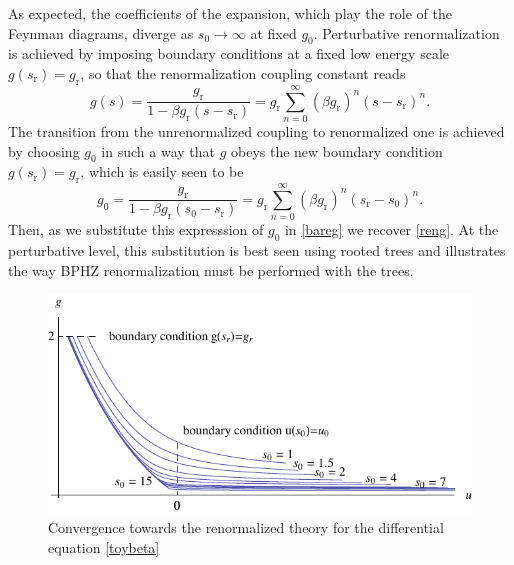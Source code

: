 \documentclass[10pt,here,feynmf]{article}
\begin{document}
As expected, the coefficients of the expansion, which play the role of the Feynman diagrams,  diverge as $s_{0}\rightarrow\infty$ at fixed $g_{0}$. Perturbative renormalization is achieved by imposing boundary conditions at a fixed low energy scale $g(s_{\mathrm{r}})=g_{\mathrm{r}}$, so that the renormalization coupling constant reads
 \begin{equation}
g(s)=\frac{g_{\mathrm{r}}}{1-\beta g_{\mathrm{r}}(s-s_{\mathrm{r}})}=g_{\mathrm{r}}\sum_{n=0}^{\infty}(\beta g_{\mathrm{r}})^{n}(s-s_{\mathrm{r}})^{n}.
\label{reng}
\end{equation}
The transition from the unrenormalized coupling to renormalized one is achieved by choosing $g_{0}$ in such a way that $g$ obeys the new boundary condition $g(s_{\mathrm{r}})=g_{\mathrm{r}}$, which is easily seen to be
 \begin{equation}
g_{0}=\frac{g_{\mathrm{r}}}{1-\beta g_{\mathrm{r}}(s_{0}-s_{\mathrm{r}})}=g_{\mathrm{r}}\sum_{n=0}^{\infty}(\beta g_{\mathrm{r}})^{n}(s_{\mathrm{r}}-s_{0})^{n}.
\end{equation}
Then, as we substitute this expresssion of $g_{0}$ in \eqref{bareg} we recover \eqref{reng}. At the perturbative level, this substitution is best seen using rooted trees and illustrates the way BPHZ renormalization must be performed with the trees. 


\begin{figure}
\begin{center}
\includegraphics[width=12cm]{flow.pdf}
\caption{Convergence towards the renormalized theory  for the differential equation \eqref{toybeta}}
\end{center}
\end{figure}
\end{document}
